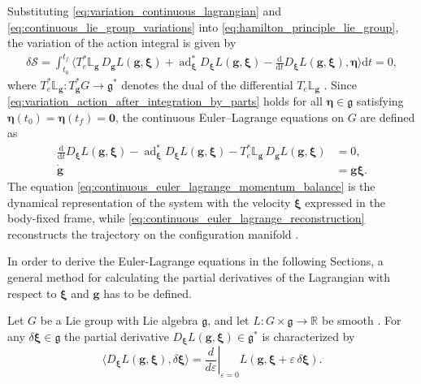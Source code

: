 Substituting \eqref{eq:variation_continuous_lagrangian} and \eqref{eq:continuous_lie_group_variations} into \eqref{eq:hamilton_principle_lie_group}, the variation of the action integral is given by
\begin{align}
    \delta\mathcal S
    =
    \int_{t_0}^{t_f}
    \Bigg\langle
        T_e^*\mathbb{L}_{\bm{g}}\,D_{\bm{g}}L(\bm{g},\bm{\xi})
        +\operatorname{ad}_{\bm{\xi}}^*D_{\bm{\xi}}L(\bm{g},\bm{\xi})
        -\frac{\mathrm d}{\mathrm dt}D_{\bm{\xi}}L(\bm{g},\bm{\xi}),
        \bm{\eta}
    \Bigg\rangle
    \mathrm dt
    =0,
    \label{eq:variation_action_after_integration_by_parts}
\end{align}
where $T_e^*\mathbb{L}_{\bm{g}}:T_{\bm{g}}^*G\rightarrow\mathfrak g^*$ denotes the dual of the differential $T_e\mathbb{L}_{\bm{g}}$ \cite{Lee2008}. Since \eqref{eq:variation_action_after_integration_by_parts} holds for all $\bm{\eta} \in \mathfrak{g}$ satisfying $\bm{\eta}(t_0)=\bm{\eta}(t_f)=\bm{0}$, the continuous Euler--Lagrange equations on $G$ are defined as
\begin{subequations}
\label{eq:continuous_euler_lagrange_lie_group}
\begin{align}
    \frac{\mathrm d}{\mathrm dt}D_{\bm{\xi}}L(\bm{g},\bm{\xi})
    -\operatorname{ad}_{\bm{\xi}}^*D_{\bm{\xi}}L(\bm{g},\bm{\xi})
    -T_e^*\mathbb{L}_{\bm{g}}\,D_{\bm{g}}L(\bm{g},\bm{\xi})
    &=0,
    \label{eq:continuous_euler_lagrange_momentum_balance}\\
    \dot{\bm{g}}&=\bm{g}\bm{\xi}.
    \label{eq:continuous_euler_lagrange_reconstruction}
\end{align}
\end{subequations}
The equation \eqref{eq:continuous_euler_lagrange_momentum_balance} is the dynamical representation of the system with the velocity $\bm{\xi}$ expressed in the body-fixed frame, while \eqref{eq:continuous_euler_lagrange_reconstruction} reconstructs the trajectory on the configuration manifold \cite{Lee2008}.

In order to derive the Euler-Lagrange equations in the following Sections, a general method for calculating the partial derivatives of the Lagrangian with respect to $\bm{\xi}$ and $\bm{g}$ has to be defined.

\begin{proposition}
Let $G$ be a Lie group with Lie algebra $\mathfrak g$, and let $L:G\times\mathfrak g\to\mathbb R$
be smooth \cite{Hall2000LieGroups}. For any $\delta\bm{\xi}\in\mathfrak g$ the partial derivative $D_{\bm{\xi}} L(\bm{g},\bm{\xi})\in\mathfrak g^*$ is characterized by
\begin{equation}\label{eq:derivative_omega}
\langle D_{\bm{\xi}} L(\bm{g},\bm{\xi}),\delta\bm{\xi}\rangle
=\left.\frac{d}{d\varepsilon}\right|_{\varepsilon=0}L(\bm{g},\bm{\xi}+\varepsilon\,\delta\bm{\xi}).
\end{equation}
\end{proposition}

